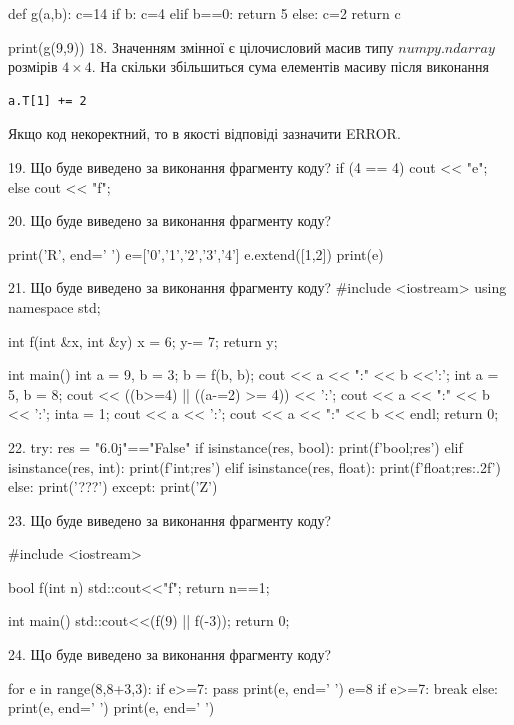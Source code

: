 \documentclass[11pt]{article}
\begin{document}
def g(a,b):
    c=14
    if b:
        c=4
    elif b==0:
         return 5
    else: 
        c=2
    return c

print(g(9,9))
18. 
Значенням змінної  є цілочисловий масив типу $numpy.ndarray$ розмірів $4{\times}4$. На скільки збільшиться сума елементів масиву  після виконання
\begin{verbatim}
a.T[1] += 2
\end{verbatim}


Якщо код некоректний, то в якості відповіді зазначити ERROR.



19. Що буде виведено за виконання фрагменту коду?
if (4 == 4)
    cout << "e";
else
    cout << "f";


20. Що буде виведено за виконання фрагменту коду?

print('R', end=' ')
e=['0','1','2','3','4']
e.extend([1,2])
print(e)


21. Що буде виведено за виконання фрагменту коду?
#include <iostream>
using namespace std;

int f(int &x, int &y){
    x = 6;
    y-= 7;
    return y;
}

int main(){
    int a = 9, b = 3;
    b = f(b, b);
    cout << a << ":" << b <<':';
    {
        int a = 5, b = 8;
        cout << ((b>=4) || ((a-=2) >= 4)) << ':';
        cout << a << ":" << b << ':';
    }
    {
        inta = 1;
        cout << a << ':';
    }
    cout << a << ":" << b << endl;
    return 0;
}


22. 
try:
    res = "6.0j"=="False"
    if isinstance(res, bool):
        print(f'bool;{res}')
    elif isinstance(res, int):
        print(f'int;{res}')
    elif isinstance(res, float):
        print(f'float;{res:.2f}')
    else:
        print('???')
except:
    print('Z')

23. Що буде виведено за виконання фрагменту коду?

#include <iostream>

bool f(int n){
    std::cout<<"f";
    return n==1;
}

int main(){
    std::cout<<(f(9) || f(-3));
    return 0;
}

24. Що буде виведено за виконання фрагменту коду?

for e in range(8,8+3,3):
    if e>=7:
        pass
    print(e, end=' ')
    e=8
    if e>=7:
        break
else:
    print(e, end=' ')
print(e, end=' ')
\end{document}
